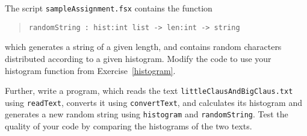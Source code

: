 The script \lstinline[language=console]{sampleAssignment.fsx} contains
the function
\begin{quote}
  \mbox{\lstinline!randomString : hist:int list -> len:int -> string!}
\end{quote}
which generates a string of a given length, and contains random
characters distributed according to a given histogram. Modify the code
to use your histogram function from Exercise~\ref{histogram}.

Further, write a program, which reads the text
\lstinline[language=console]{littleClausAndBigClaus.txt} using
\lstinline{readText}, converts it using \lstinline{convertText}, and
calculates its histogram and generates a new random string using
\lstinline{histogram} and \lstinline{randomString}.  Test the quality
of your code by comparing the histograms of the two texts.
